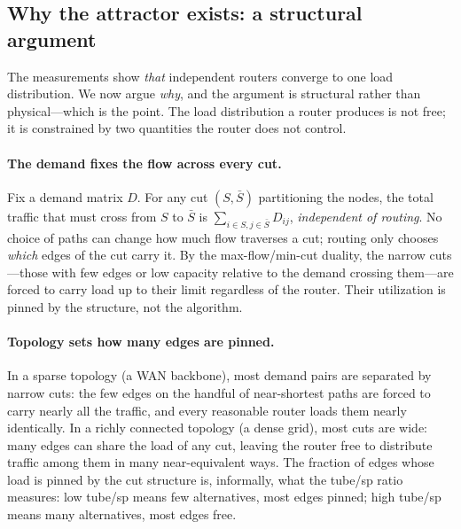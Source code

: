 \subsection{Why the attractor exists: a structural argument}
\label{sec:attractor-why}

The measurements show \emph{that} independent routers converge to one load
distribution. We now argue \emph{why}, and the argument is structural rather
than physical---which is the point. The load distribution a router produces is
not free; it is constrained by two quantities the router does not control.

\paragraph{The demand fixes the flow across every cut.} Fix a demand matrix
$D$. For any cut $(S, \bar S)$ partitioning the nodes, the total traffic that
must cross from $S$ to $\bar S$ is $\sum_{i \in S, j \in \bar S} D_{ij}$,
\emph{independent of routing}. No choice of paths can change how much flow
traverses a cut; routing only chooses \emph{which} edges of the cut carry it.
By the max-flow/min-cut duality, the narrow cuts---those with few edges or low
capacity relative to the demand crossing them---are forced to carry load up to
their limit regardless of the router. Their utilization is pinned by the
structure, not the algorithm.

\paragraph{Topology sets how many edges are pinned.} In a sparse topology
(a WAN backbone), most demand pairs are separated by narrow cuts: the few
edges on the handful of near-shortest paths are forced to carry nearly all the
traffic, and every reasonable router loads them nearly identically. In a richly
connected topology (a dense grid), most cuts are wide: many edges can share the
load of any cut, leaving the router free to distribute traffic among them in
many near-equivalent ways. The fraction of edges whose load is pinned by the
cut structure is, informally, what the tube/sp ratio measures: low tube/sp
means few alternatives, most edges pinned; high tube/sp means many
alternatives, most edges free.

